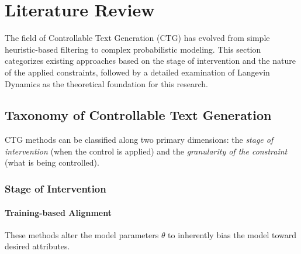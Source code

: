 \documentclass[11pt]{article}
\begin{document}

\section{Literature Review}

The field of Controllable Text Generation (CTG) has evolved from simple heuristic-based filtering to complex probabilistic modeling. This section categorizes existing approaches based on the stage of intervention and the nature of the applied constraints, followed by a detailed examination of Langevin Dynamics as the theoretical foundation for this research.

\subsection{Taxonomy of Controllable Text Generation}

CTG methods can be classified along two primary dimensions: the \emph{stage of intervention} (when the control is applied) and the \emph{granularity of the constraint} (what is being controlled).

\subsubsection{Stage of Intervention}

\paragraph{Training-based Alignment}
These methods alter the model parameters $\theta$ to inherently bias the model toward desired attributes.
\end{document}
